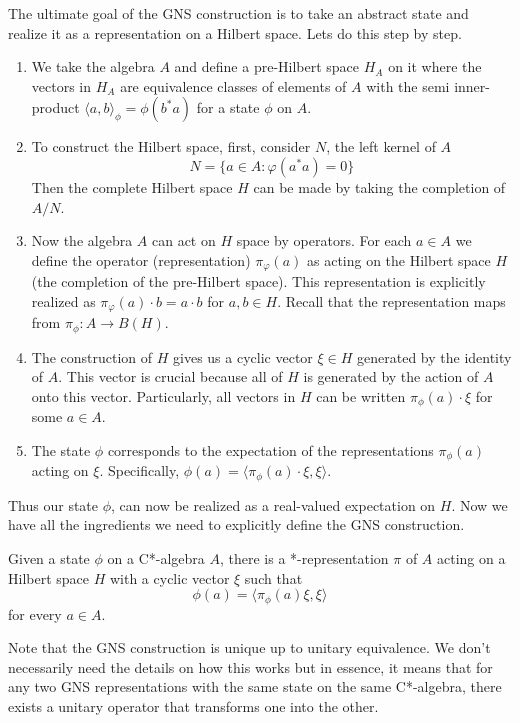 The ultimate goal of the GNS construction is to take an abstract state
and realize it as a representation on a Hilbert space. Lets do this step by step.
\begin{enumerate}
    \item We take the algebra $A$ and define a pre-Hilbert space $H_A$ on it where the vectors
    in $H_A$ are equivalence classes of elements of $A$ with the semi inner-product
    $\langle a, b \rangle_\phi = \phi(b^*a)$ for a state $\phi$ on $A$.
    \item To construct the Hilbert space, first, consider $N$, the left kernel of $A$
    \begin{equation}
        N = \{ a \in A : \varphi(a^*a) = 0 \}
    \end{equation}
    Then the complete Hilbert space $H$ can be made by taking the completion of $A/N$.
    \item Now the algebra $A$ can act on $H$ space by operators. For
    each $a \in A$ we define the operator (representation) $\pi_\varphi (a)$ as acting
    on the Hilbert space $H$ (the completion of the pre-Hilbert space). This representation
    is explicitly realized as $\pi_\varphi(a) \cdot b = a \cdot b$ for $a,b \in H$.
    Recall that the representation maps from $\pi_\phi: A \to B(H)$.
    \item The construction of $H$ gives us a cyclic vector $\xi \in H$ generated by
    the identity of $A$. This vector is crucial because all of $H$ is generated
    by the action of $A$ onto this vector. Particularly, all vectors in $H$ can
    be written $\pi_\phi(a) \cdot \xi$ for some $a \in A$.
    \item The state $\phi$ corresponds to the expectation of the representations
    $\pi_\phi(a)$ acting on $\xi$. Specifically, $\phi(a) = \langle \pi_\phi(a) \cdot \xi, \xi \rangle$.
\end{enumerate}
Thus our state $\phi$, can now be realized as a real-valued expectation on $H$.
Now we have all the ingredients we need to explicitly define the GNS construction.

\begin{theorem}
    Given a state $\phi$ on a C*-algebra $A$, there is a *-representation $\pi$ of $A$ acting
    on a Hilbert space $H$ with a cyclic vector $\xi$ such that
    \begin{equation}
        \phi(a) = \langle \pi_\phi(a)\xi , \xi \rangle
    \end{equation}
    for every $a \in A$.
\end{theorem}
Note that the GNS construction is unique up to unitary equivalence. We don't necessarily
need the details on how this works but in essence, it means that for any two GNS
representations with the same state on the same C*-algebra, there exists a unitary
operator that transforms one into the other. 


